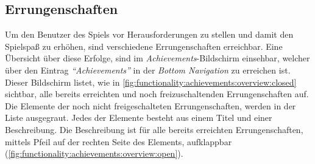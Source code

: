 \documentclass[a4paper]{article}
\begin{document}
\subsection{Errungenschaften}
\label{subsec:functionality:achievements}
Um den Benutzer des Spiels vor Herausforderungen zu stellen und damit den Spielspaß zu erhöhen, sind verschiedene Errungenschaften erreichbar.
Eine Übersicht über diese Erfolge, sind im \textit{Achievements}-Bildschirm einsehbar, welcher über den Eintrag \textit{"`Achievements"'} in der \textit{Bottom Navigation} zu erreichen ist.
Dieser Bildschirm listet, wie in \autoref{fig:functionality:achievements:overview:closed} sichtbar, alle bereits erreichten und noch freizuschaltenden Errungenschaften auf.
Die Elemente der noch nicht freigeschalteten Errungenschaften, werden in der Liste ausgegraut.
Jedes der Elemente besteht aus einem Titel und einer Beschreibung.
Die Beschreibung ist für alle bereits erreichten Errungenschaften, mittels Pfeil auf der rechten Seite des Elements, aufklappbar (\autoref{fig:functionality:achievements:overview:open}).
\end{document}
